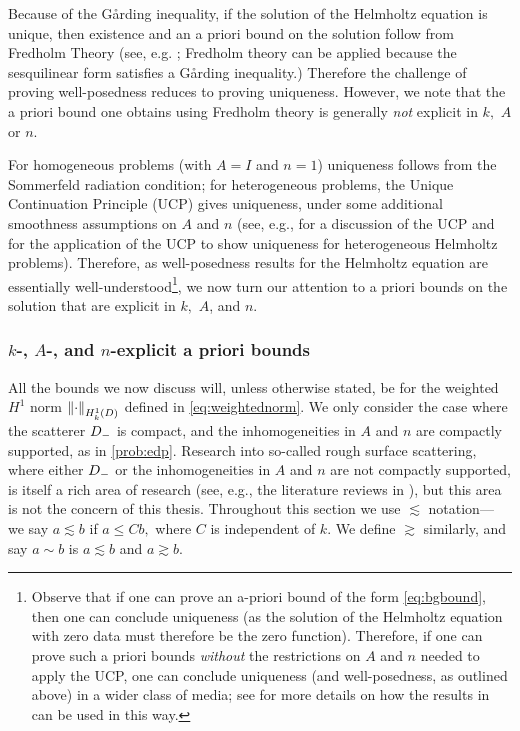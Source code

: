 Because of the G\r{a}rding inequality, if the solution of the Helmholtz equation is unique, then existence and an a priori bound on the solution follow from Fredholm Theory (see, e.g. \cite[Theorems 5.10 and 5.18]{Sp:15}; Fredholm theory can be applied because the sesquilinear form satisfies a G\r{a}rding inequality.) Therefore the challenge of proving well-posedness reduces to proving uniqueness. However, we note that the a priori bound one obtains using Fredholm theory is generally \emph{not} explicit in $k,$ $A$ or $n$.

For homogeneous problems (with $A=I$ and $n=1$) uniqueness follows from the Sommerfeld radiation condition; for heterogeneous problems, the Unique Continuation Principle (UCP) gives uniqueness, under some additional smoothness assumptions on $A$ and $n$ (see, e.g., \cite[p. 2871]{GrPeSp:19} for a discussion of the UCP and \cite[Section 2]{GrSa:18} for the application of the UCP to show uniqueness for heterogeneous Helmholtz problems). Therefore, as well-posedness results for the Helmholtz equation are essentially well-understood\footnote{Observe that if one can prove an a-priori bound of the form \eqref{eq:bgbound}, then one can conclude uniqueness (as the solution of the Helmholtz equation with zero data must therefore be the zero function). Therefore, if one can prove such a priori bounds \emph{without} the restrictions on $A$ and $n$ needed to apply the UCP, one can conclude uniqueness (and well-posedness, as outlined above) in a wider class of media; see \cite[pp. 2873, 2883]{GrPeSp:19} for more details on how the results in \cite{GrPeSp:19} can be used in this way.}, we now turn our attention to a priori bounds on the solution that are explicit in $k,$ $A$, and $n.$

\subsubsection{$k$-, $A$-, and $n$-explicit a priori bounds}
 All the bounds we now discuss will, unless otherwise stated, be for the weighted $H^1$ norm $\NHokD{\cdot}$ defined in \cref{eq:weightednorm}. We  only consider the case where the scatterer $D_{-}$ is compact, and the inhomogeneities in $A$ and $n$ are compactly supported, as in \cref{prob:edp}. Research into so-called rough surface scattering, where either $D_{-}$ or the inhomogeneities in $A$ and $n$ are not compactly supported, is itself a rich area of research (see, e.g., the literature reviews in \cite{Th:06}), but this area is not the concern of this thesis. Throughout this section we use $\lesssim$ notation--- we say $a \lesssim b$ if $a \leq C b,$ where $C$ is independent of $k$. We define $\gtrsim$ similarly, and say $a \sim b$ is $a \lesssim b$ and $a \gtrsim b.$

